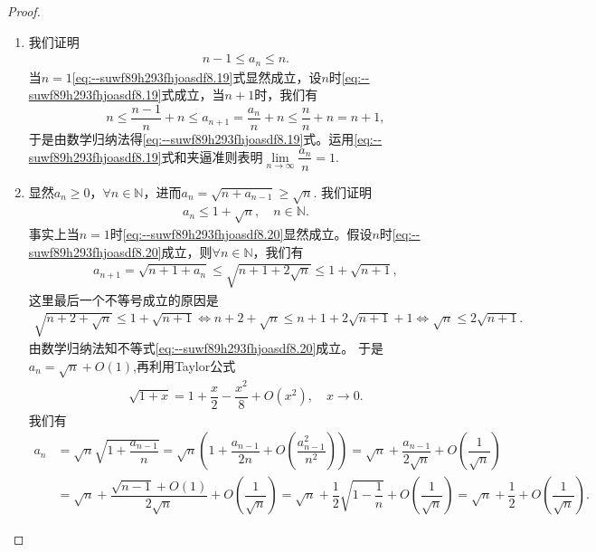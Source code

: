 \documentclass[../../main.tex]{subfiles}%
\begin{document}
\begin{proof}
\begin{enumerate}
\item 我们证明
\begin{align}
n - 1 \leqslant a_n \leqslant n. \label{eq:--suwf89h293fhjoasdf8.19}
\end{align}
当$n=1$\eqref{eq:--suwf89h293fhjoasdf8.19}式显然成立，设$n$时\eqref{eq:--suwf89h293fhjoasdf8.19}式成立，当$n+1$时，我们有
$$n \leqslant \dfrac{n - 1}{n} + n \leqslant a_{n+1} = \dfrac{a_n}{n} + n \leqslant \dfrac{n}{n} + n = n + 1,$$
于是由数学归纳法得\eqref{eq:--suwf89h293fhjoasdf8.19}式。运用\eqref{eq:--suwf89h293fhjoasdf8.19}式和夹逼准则表明$\lim\limits_{n \to \infty} \dfrac{a_n}{n} = 1$.

\item 显然$a_n \geqslant 0$，$\forall n \in \mathbb{N}$，进而$a_n = \sqrt{n + a_{n-1}} \geqslant \sqrt{n}$.
我们证明
\begin{align}
a_n \leqslant 1 + \sqrt{n},\quad n \in \mathbb{N}. \label{eq:--suwf89h293fhjoasdf8.20}
\end{align}
事实上当$n=1$时\eqref{eq:--suwf89h293fhjoasdf8.20}显然成立。假设$n$时\eqref{eq:--suwf89h293fhjoasdf8.20}成立，则$\forall n \in \mathbb{N}$，我们有
\begin{align*}
a_{n+1} = \sqrt{n + 1 + a_n} \leqslant \sqrt{n + 1 + 2\sqrt{n}} \leqslant 1 + \sqrt{n + 1},
\end{align*}
这里最后一个不等号成立的原因是
\begin{align*}
\sqrt{n + 2 + \sqrt{n}} \leqslant 1 + \sqrt{n + 1} \iff n + 2 + \sqrt{n} \leqslant n + 1 + 2\sqrt{n + 1} + 1 \iff \sqrt{n} \leqslant 2\sqrt{n + 1}.
\end{align*}
由数学归纳法知不等式\eqref{eq:--suwf89h293fhjoasdf8.20}成立。
于是$a_n = \sqrt{n} + O(1)$,再利用Taylor公式
\begin{align*}
\sqrt{1 + x} = 1 + \dfrac{x}{2} - \dfrac{x^2}{8} + O(x^2),\quad x\to 0.
\end{align*}
我们有
\begin{align*}
a_n &= \sqrt{n}\sqrt{1 + \dfrac{a_{n-1}}{n}} = \sqrt{n}\left( 1 + \dfrac{a_{n-1}}{2n} + O\left( \dfrac{a_{n-1}^2}{n^2} \right) \right) = \sqrt{n} + \dfrac{a_{n-1}}{2\sqrt{n}} + O\left( \dfrac{1}{\sqrt{n}} \right) \\
&= \sqrt{n} + \dfrac{\sqrt{n - 1} + O(1)}{2\sqrt{n}} + O\left( \dfrac{1}{\sqrt{n}} \right) = \sqrt{n} + \dfrac{1}{2}\sqrt{1 - \dfrac{1}{n}} + O\left( \dfrac{1}{\sqrt{n}} \right) = \sqrt{n} + \dfrac{1}{2} + O\left( \dfrac{1}{\sqrt{n}} \right).

\end{align*}
\end{enumerate}
\end{proof}
\end{document}
